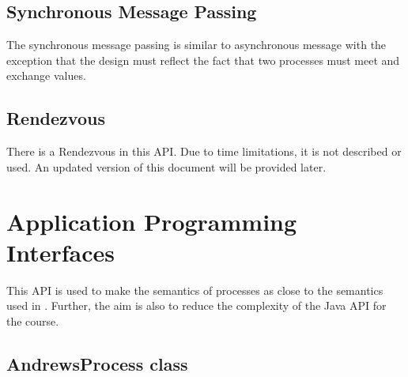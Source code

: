 \documentclass[11pt]{article} %
\begin{document}
\subsection{Synchronous Message Passing}

The synchronous message passing is similar to asynchronous message with the exception that the design must reflect the fact that two processes must meet and exchange values.

\subsection{Rendezvous}

There is a Rendezvous in this API. Due to time limitations, it is not described or used. An updated version of this document will be provided later. 

\section{Application Programming Interfaces}

This API is used to make the semantics of processes as close to the semantics used in \cite{andrews_foundations_2000}. Further, the aim is also to reduce the complexity of the Java API for the course. 

\subsection{AndrewsProcess class}
\end{document}
